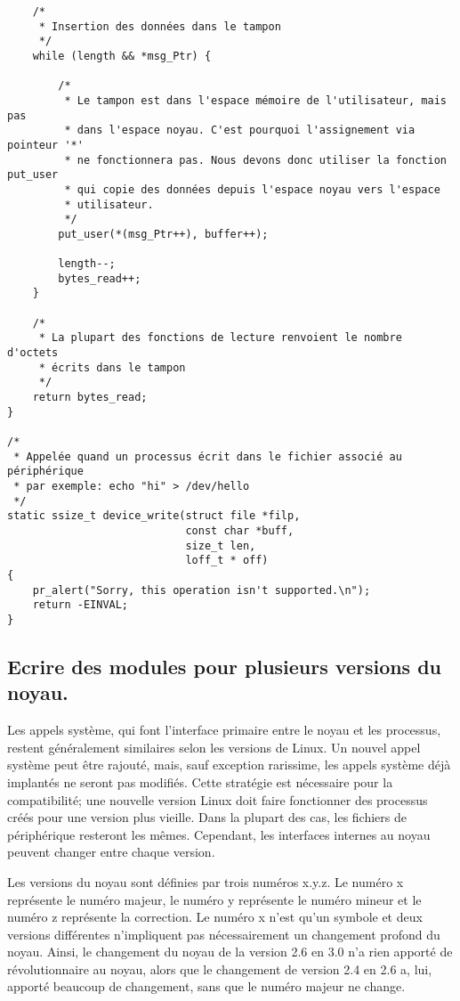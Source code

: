 \documentclass[11pt]{article}
\begin{document}
\begin{verbatim}
    /*
     * Insertion des données dans le tampon
     */
    while (length && *msg_Ptr) {

        /*
         * Le tampon est dans l'espace mémoire de l'utilisateur, mais pas
         * dans l'espace noyau. C'est pourquoi l'assignement via pointeur '*'
         * ne fonctionnera pas. Nous devons donc utiliser la fonction put_user
         * qui copie des données depuis l'espace noyau vers l'espace
         * utilisateur.
         */
        put_user(*(msg_Ptr++), buffer++);

        length--;
        bytes_read++;
    }

    /*
     * La plupart des fonctions de lecture renvoient le nombre d'octets
     * écrits dans le tampon
     */
    return bytes_read;
}

/*
 * Appelée quand un processus écrit dans le fichier associé au périphérique
 * par exemple: echo "hi" > /dev/hello
 */
static ssize_t device_write(struct file *filp,
                            const char *buff,
                            size_t len,
                            loff_t * off)
{
    pr_alert("Sorry, this operation isn't supported.\n");
    return -EINVAL;
}
\end{verbatim}

\subsection*{Ecrire des modules pour plusieurs versions du noyau.}
\label{sec-6-6}

Les appels système, qui font l'interface primaire entre le noyau et les processus, restent généralement similaires selon les versions de Linux. Un nouvel appel système peut être rajouté, mais, sauf exception rarissime, les appels système déjà implantés ne seront pas modifiés. Cette stratégie est nécessaire pour la compatibilité; une nouvelle version Linux doit faire fonctionner des processus créés pour une version plus vieille. Dans la plupart des cas, les fichiers de périphérique resteront les mêmes. Cependant, les interfaces internes au noyau peuvent changer entre chaque version.

Les versions du noyau sont définies par trois numéros x.y.z. Le numéro x représente le numéro majeur, le numéro y représente le numéro mineur et le numéro z représente la correction. Le numéro x n'est qu'un symbole et deux versions différentes n'impliquent pas nécessairement un changement profond du noyau. Ainsi, le changement du noyau de la version 2.6 en 3.0 n'a rien apporté de révolutionnaire au noyau, alors que le changement de version 2.4 en 2.6 a, lui, apporté beaucoup de changement, sans que le numéro majeur ne change.
\end{document}
